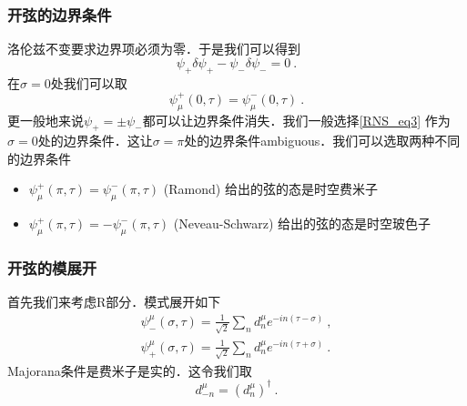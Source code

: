 \subsubsection{开弦的边界条件}
洛伦兹不变要求边界项必须为零．于是我们可以得到
\begin{equation}
\psi_+ \delta \psi_+ - \psi_- \delta \psi_- = 0~.
\end{equation}
在$\sigma = 0$处我们可以取
\begin{equation}\label{RNS_eq3}
\psi^+_\mu(0,\tau) = \psi^-_{\mu} (0,\tau) ~.
\end{equation}
更一般地来说$\psi_+ = \pm \psi_-$都可以让边界条件消失．我们一般选择\autoref{RNS_eq3} 作为$\sigma = 0$处的边界条件．这让$\sigma = \pi$处的边界条件ambiguous．我们可以选取两种不同的边界条件
\begin{itemize}
\item $\psi^+_\mu(\pi,\tau) = \psi^-_\mu(\pi,\tau)$ (Ramond)
给出的弦的态是时空费米子
\item $\psi^+_\mu(\pi,\tau) = - \psi^-_\mu(\pi,\tau)$ (Neveau-Schwarz) 给出的弦的态是时空玻色子
\end{itemize}

\subsubsection{开弦的模展开}
首先我们来考虑R部分．模式展开如下
\begin{equation}
\begin{aligned}
\psi^\mu_-(\sigma,\tau) = \frac{1}{\sqrt{2}} \sum_n d^\mu_n e^{- i n (\tau-\sigma)}~, \\
\psi^\mu_+(\sigma, \tau ) = \frac{1}{\sqrt{2}} \sum_n d^\mu_n e^{- i n (\tau+\sigma)}~.
\end{aligned}
\end{equation}
Majorana条件是费米子是实的．这令我们取
\begin{equation}
d^\mu_{-n} = (d^\mu_n)^\dagger~.
\end{equation}
















































